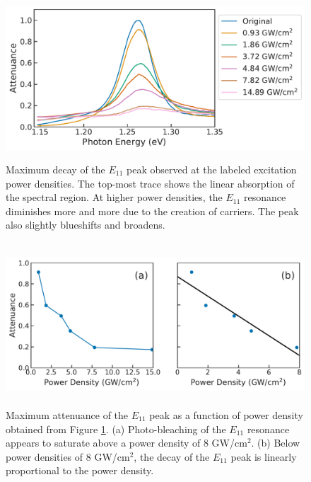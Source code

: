 \begin{figure}[ht]
	\centering
	\includegraphics[height=2.4in]{images/chapter_my_data/Weilu_CNT_abs_max_change}
	\caption{Maximum decay of the $E_{11}$ peak observed at the labeled excitation power densities. The top-most trace shows the linear absorption of the spectral region. At higher power densities, the $E_{11}$ resonance diminishes more and more due to the creation of carriers. The peak also slightly blueshifts and broadens.}
	\label{fig:weilu_cnt_max_decay}
\end{figure}

\begin{figure}[H]
	\centering
	\includegraphics[height=2.4in]{images/chapter_my_data/Weilu_CNT_max_attenuance_and_fit}
	\caption{Maximum attenuance of the $E_{11}$ peak as a function of power density obtained from Figure \ref{fig:weilu_cnt_max_decay}. (a) Photo-bleaching of the $E_{11}$ resonance appears to saturate above a power density of 8 GW/cm$^2$. (b) Below power densities of 8 GW/cm$^2$, the decay of the $E_{11}$ peak is linearly proportional to the power density.}
	\label{fig:weilu_cnt_max_decay_fit}
\end{figure}

